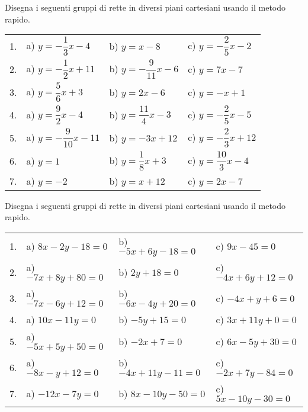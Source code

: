 \subsubsection*{}

\begin{esercizio}\label{ese:}
Disegna i seguenti gruppi di rette in diversi 
piani cartesiani usando il metodo rapido.

\begin{tabular}{llll}
1. &
a) \quad \(y = -\dfrac{1}{3} x -4\) & 
b) \quad \(y = x -8\) & 
c) \quad \(y = -\dfrac{2}{5} x -2\) \\
2. &
a) \quad \(y = -\dfrac{1}{2} x +11\) &   
b) \quad \(y = -\dfrac{9}{11} x -6\) &
c) \quad \(y = 7 x -7\) \\
3. &
a) \quad \(y = \dfrac{5}{6} x +3\) &   
b) \quad \(y = 2 x -6\) &
c) \quad \(y = - x +1\) \\
4. &
a) \quad \(y = \dfrac{9}{2} x -4\) &   
b) \quad \(y = \dfrac{11}{4} x -3\) &
c) \quad \(y = -\dfrac{2}{5} x -5\) \\
5. &
a) \quad \(y = -\dfrac{9}{10} x -11\) &   
b) \quad \(y = -3 x +12\) &
c) \quad \(y = -\dfrac{2}{3} x +12\) \\
6. &
a) \quad \(y = 1\) &   
b) \quad \(y = \dfrac{1}{8} x +3\) &
c) \quad \(y = \dfrac{10}{3} x -4\) \\
7. &
a) \quad \(y = -2\) &   
b) \quad \(y = x +12\) &
c) \quad \(y = 2x -7\) \\
\end{tabular}
\end{esercizio}

\begin{esercizio}\label{ese:}
Disegna i seguenti gruppi di rette in diversi 
piani cartesiani usando il metodo rapido.

\begin{tabular}{llll}
1. &
a) \quad \(8 x - 2 y - 18 = 0\) & 
b) \quad \(-5 x + 6 y - 18 = 0\) & 
c) \quad \(9 x - 45 = 0\) \\
2. &
a) \quad \(-7 x + 8 y + 80 = 0\) &   
b) \quad \(2 y + 18 = 0\) &
c) \quad \(-4 x + 6 y + 12 = 0\) \\
3. &
a) \quad \(-7 x - 6 y + 12 = 0\) &   
b) \quad \(-6 x - 4 y + 20 = 0\) &
c) \quad \(-4 x + y + 6 = 0\) \\
4. &
a) \quad \(10 x - 11 y = 0\) &   
b) \quad \(- 5 y + 15 = 0\) &
c) \quad \(3 x + 11 y + 0 = 0\) \\
5. &
a) \quad \(-5 x + 5 y + 50 = 0\) &   
b) \quad \(-2 x + 7 = 0\) &
c) \quad \(6 x - 5 y + 30 = 0\) \\
6. &
a) \quad \(-8 x - y + 12 = 0\) &   
b) \quad \(-4 x + 11 y - 11 = 0\) &
c) \quad \(-2 x + 7 y - 84 = 0\) \\
7. &
a) \quad \(-12 x - 7 y = 0\) &   
b) \quad \(8 x - 10 y - 50 = 0\) &
c) \quad \(5 x - 10 y - 30 = 0\) \\
\end{tabular}
\end{esercizio}


